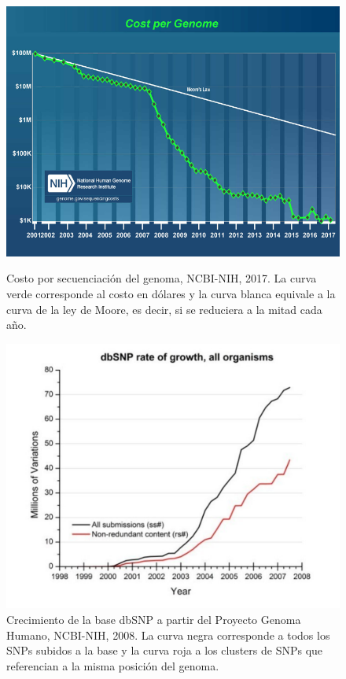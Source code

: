 \begin{figure}[H]
\begin{minipage}[c]{0.45\linewidth}
\includegraphics[width=\linewidth]{documents/latex/figures/1/costpergenome_2017.pdf}
\caption{Costo por secuenciación del genoma, NCBI-NIH, 2017. La curva verde corresponde al costo en dólares y la curva blanca equivale a la curva de la ley de Moore, es decir, si se reduciera a la mitad cada año.}
\label{fig:cost_per_genome}
\end{minipage}
\hfill
\begin{minipage}[c]{0.45\linewidth}
\includegraphics[width=\linewidth]{documents/latex/figures/1/increase_dbsnp.pdf}
\caption{Crecimiento de la base dbSNP a partir del Proyecto Genoma Humano, NCBI-NIH, 2008. La curva negra corresponde a todos los SNPs subidos a la base y la curva roja a los clusters de SNPs que referencian a la misma posición del genoma.}
\label{fig:dbsnp_growth_rate}
\end{minipage}%
\end{figure}

